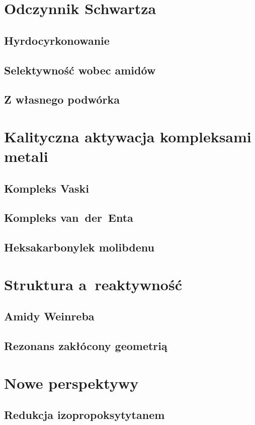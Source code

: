 \section{Odczynnik Schwartza}
\subsection{Hyrdocyrkonowanie}
\subsection{Selektywność wobec amidów}
\subsection{Z własnego podwórka}

\section{Kalityczna aktywacja kompleksami metali}
\subsection{Kompleks Vaski}
\subsection{Kompleks van~der~Enta}
\subsection{Heksakarbonylek molibdenu}

\section{Struktura a~reaktywność}
\subsection{Amidy Weinreba}
\subsection{Rezonans zakłócony geometrią}

\section{Nowe perspektywy}
\subsection{Redukcja izopropoksytytanem}
